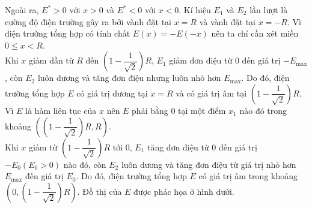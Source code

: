 \begin{loigiai}
\begin{enumerate}[1)]
        Ngoài ra, $E^{*}>0$ với $x>0$ và $E^{*}<0$ với $x<0$.
        Kí hiệu $E_1$ và $E_2$ lần lượt là cường độ điện trường gây ra bởi vành đặt tại $x=R$ và vành đặt tại $x=-R$. Vì điện trường tổng hợp có tính chất $E(x)=-E(-x)$ nên ta chỉ cần xét miền $0 \leq x<R$.
        \\ Khi $x$ giảm dần từ $R$ đến $\left(1-\dfrac{1}{\sqrt{2}}\right)R$, $E_1$ giảm đơn điệu từ 0 đến giá trị $-E_{\max}$, còn $E_2$ luôn dương và tăng đơn điệu nhưng luôn nhỏ hơn $E_{\max}$. Do đó, điện trường tổng hợp $E$ có giá trị dương tại $x=R$ và có giá trị âm tại $\left(1-\dfrac{1}{\sqrt{2}}\right)R$. Vì $E$ là hàm liên tục của $x$ nên $E$ phải bằng 0 tại một điểm $x_1$ nào đó trong khoảng $\left( {\left( {1 - \dfrac{1}{{\sqrt 2 }}} \right)R,R} \right)$.
        \\ Khi $x$ giảm từ $\left(1-\dfrac{1}{\sqrt{2}}\right)R$ tới 0, $E_1$ tăng đơn điệu từ 0 đến giá trị $-E_0 (E_0>0)$ nào đó, còn $E_2$ luôn dương và tăng đơn điệu từ giá trị nhỏ hơn $E_{\max}$ đến giá trị $E_0$. Do đó, điện trường tổng hợp $E$ có giá trị âm trong khoảng $\left( {0,\left( {1 - \dfrac{1}{{\sqrt 2 }}} \right)R} \right)$. Đồ thị của $E$ được phác họa ở hình dưới.
        \begin{center}
            


\end{center}
\end{enumerate}
\end{loigiai}
